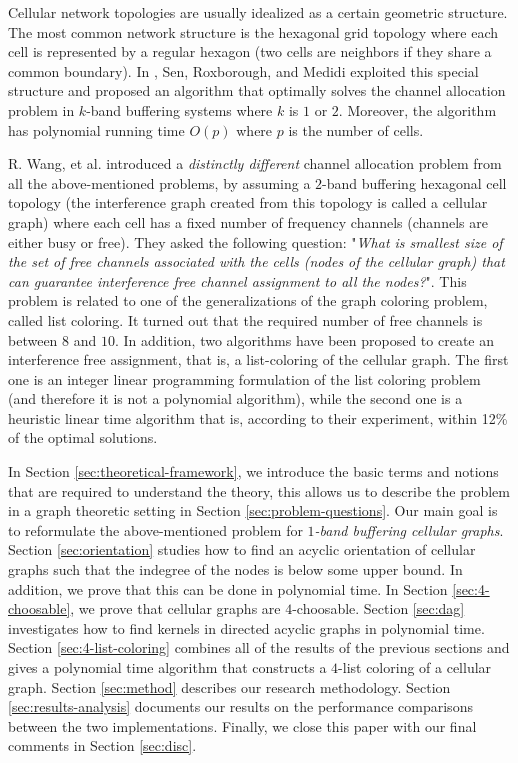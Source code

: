 \documentclass[letterpaper, 10 pt, conference]{ieeeconf}  %
\begin{document}
Cellular network topologies are usually idealized as a certain geometric structure. The most common network structure is the hexagonal grid topology where each cell is represented by a regular hexagon (two cells are neighbors if they share a common boundary). In \cite{662943}, Sen, Roxborough, and Medidi exploited this special structure and proposed an algorithm that optimally solves the channel allocation problem in $k$-band buffering systems where $k$ is $1$ or $2$. Moreover, the algorithm has polynomial running time $O(p)$ where $p$ is the number of cells.

R. Wang, et al. \cite{7248845} introduced a \textit{distinctly different} channel allocation problem from all the above-mentioned problems, by assuming a $2$-band buffering hexagonal cell topology (the interference graph created from this topology is called a cellular graph) where each cell has a fixed number of frequency channels (channels are either busy or free). They asked the following question: "\textit{What is smallest size of the set of free channels associated with the cells (nodes of the cellular graph) that can guarantee interference free channel assignment to all the nodes?}". This problem is related to one of the generalizations of the graph coloring problem, called list coloring. It turned out that the required number of free channels is between $8$ and $10$. In addition, two algorithms have been proposed to create an interference free assignment, that is, a list-coloring of the cellular graph. The first one is an integer linear programming formulation of the list coloring problem (and therefore it is not a polynomial algorithm), while the second one is a heuristic linear time algorithm that is, according to their experiment, within 12\% of the optimal solutions.

In Section \ref{sec:theoretical-framework}, we introduce the basic terms and notions that are required to understand the theory, this allows us to describe the problem in a graph theoretic setting in Section \ref{sec:problem-questions}. Our main goal is to reformulate the above-mentioned problem for \textit{$1$-band buffering cellular graphs}. Section \ref{sec:orientation} studies how to find an acyclic orientation of cellular graphs such that the indegree of the nodes is below some upper bound. In addition, we prove that this can be done in polynomial time. In Section \ref{sec:4-choosable}, we prove that cellular graphs are $4$-choosable. Section \ref{sec:dag} investigates how to find kernels in directed acyclic graphs in polynomial time. Section \ref{sec:4-list-coloring} combines all of the results of the previous sections and gives a polynomial time algorithm that constructs a $4$-list coloring of a cellular graph. Section \ref{sec:method} describes our research methodology. Section \ref{sec:results-analysis} documents our results on the performance comparisons between the two implementations. Finally, we close this paper with our final comments in Section \ref{sec:disc}.
\end{document}
